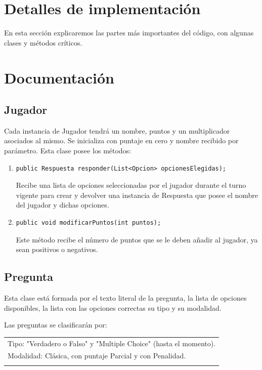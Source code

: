 \documentclass[titlepage,a4paper]{article}
\begin{document}
\section{Detalles de implementación}

En esta sección explicaremos las partes más importantes del código, con algunas clases y métodos críticos.

\section{Documentación}

\subsection{Jugador}
Cada instancia de Jugador tendrá un nombre, puntos y un multiplicador asociados al mismo. Se inicializa con puntaje en cero y nombre recibido por parámetro. Esta clase posee los métodos:
\begin{enumerate}
\item \begin{verbatim}public Respuesta responder(List<Opcion> opcionesElegidas);\end{verbatim} Recibe una lista de opciones seleccionadas por el jugador durante el turno vigente para crear y devolver una instancia de Respuesta que posee el nombre del jugador y dichas opciones. 
\item \begin{verbatim}public void modificarPuntos(int puntos);\end{verbatim} Este método recibe el número de puntos que se le deben añadir al jugador, ya sean positivos o negativos. 
\end{enumerate}

\subsection{Pregunta}
Esta clase está formada por el texto literal de la pregunta, la lista de opciones disponibles, la lista con las opciones correctas su tipo y su modalidad.

Las preguntas se clasificarán por:\\

\begin{tabular}{l}
Tipo: "Verdadero o Falso"$ $ y "Multiple Choice" $ $(hasta el momento).\\
Modalidad: Clásica, con puntaje Parcial y con Penalidad.\\\\
\end{tabular}
\end{document}
